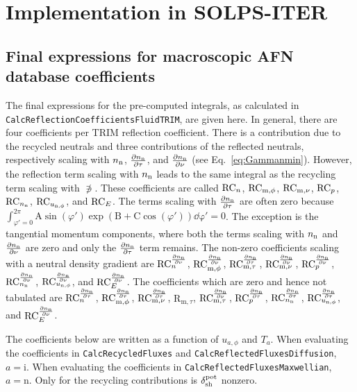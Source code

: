 \chapter{Implementation in SOLPS-ITER}

\section{Final expressions for macroscopic AFN database coefficients}\label{sec:final_expressions_RC}

The final expressions for the pre-computed integrals, as calculated in \texttt{CalcReflectionCoefficientsFluidTRIM}, are given here. In general, there are four coefficients per TRIM reflection coefficient.
There is a contribution due to the recycled neutrals and three contributions of the reflected neutrals, respectively scaling with $\nn$, $\dnndy$, and $\dnndz$ (see Eq.~\eqref{eq:Gammanmin}). However, the reflection term scaling with $\nn$ leads to the same integral as the recycling term scaling with $\nni$. These coefficients are called $\rconei$, $\rmxonei$, $\rmzonei$, $\rponeonei$, $\rptwoonei$, $\rpthreeonei$, and $\reonei$. The terms scaling with $\dnndy$ are often zero because $\int_{\varphi'=0}^{2 \pi} \mathrm{A} \sin(\varphi') \exp \left( \mathrm{B} + \mathrm{C} \cos(\varphi') \right) \dd \mathrm{\varphi'} = 0$. The exception is the tangential momentum components, where both the terms scaling with $\nn$ and $\dnndz$ are zero and only the $\dnndy$ term remains. The non-zero coefficients scaling with a neutral density gradient are $\rctwoi$, $\rmxtwoi$, $\rmytwoi$, $\rmztwoi$, $\rponetwoi$, $\rptwotwoi$, $\rpthreetwoi$, and $\retwoi$. The coefficients which are zero and hence not tabulated are $\mathrm{RC}_n^{\dnndy}$, $\mathrm{RC}_{\mathrm{m},\phi}^{\dnndy}$, $\mathrm{RC}_{\mathrm{m},\nu}^{\dnndy}$, $\mathrm{R}_{\mathrm{m},\tau}$, $\mathrm{RC}_{\mathrm{m},\tau}^{\dnndz}$, $\mathrm{RC}_{p}^{\dnndy}$, $\mathrm{RC}_{n_{\mathrm{n}}}^{\dnndy}$, $\mathrm{RC}_{u_{\mathrm{n},\phi}}^{\dnndy}$, and $\mathrm{RC}_{E}^{\dnndz}$.


The coefficients below are written as a function of $u_{a,\phi}$ and $T_a$. When evaluating the coefficients in \texttt{CalcRecycledFluxes} and \texttt{CalcReflectedFluxesDiffusion}, $a = \mathrm{i}$. When evaluating the coefficients in \texttt{CalcReflectedFluxesMaxwellian}, $a = \mathrm{n}$. Only for the recycling contributions is $\dshpot$ nonzero.

